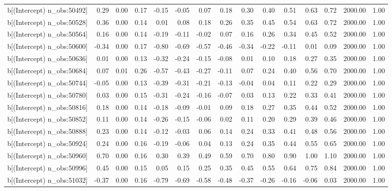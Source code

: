 \begin{table}[ht]
\begin{tabular}{rrrrrrrrrrrrrrr}
  b[(Intercept) n\_obs:50492] & 0.29 & 0.00 & 0.17 & -0.15 & -0.05 & 0.07 & 0.18 & 0.30 & 0.40 & 0.51 & 0.63 & 0.72 & 2000.00 & 1.00 \\ 
  b[(Intercept) n\_obs:50528] & 0.36 & 0.00 & 0.14 & 0.01 & 0.08 & 0.18 & 0.26 & 0.35 & 0.45 & 0.54 & 0.63 & 0.72 & 2000.00 & 1.00 \\ 
  b[(Intercept) n\_obs:50564] & 0.16 & 0.00 & 0.14 & -0.19 & -0.11 & -0.02 & 0.07 & 0.16 & 0.26 & 0.34 & 0.45 & 0.52 & 2000.00 & 1.00 \\ 
  b[(Intercept) n\_obs:50600] & -0.34 & 0.00 & 0.17 & -0.80 & -0.69 & -0.57 & -0.46 & -0.34 & -0.22 & -0.11 & 0.01 & 0.09 & 2000.00 & 1.00 \\ 
  b[(Intercept) n\_obs:50636] & 0.01 & 0.00 & 0.13 & -0.32 & -0.24 & -0.15 & -0.08 & 0.01 & 0.10 & 0.18 & 0.27 & 0.35 & 2000.00 & 1.00 \\ 
  b[(Intercept) n\_obs:50684] & 0.07 & 0.01 & 0.26 & -0.57 & -0.43 & -0.27 & -0.11 & 0.07 & 0.24 & 0.40 & 0.56 & 0.70 & 2000.00 & 1.00 \\ 
  b[(Intercept) n\_obs:50744] & -0.05 & 0.00 & 0.13 & -0.39 & -0.31 & -0.21 & -0.13 & -0.04 & 0.04 & 0.11 & 0.22 & 0.29 & 2000.00 & 1.00 \\ 
  b[(Intercept) n\_obs:50780] & 0.03 & 0.00 & 0.15 & -0.31 & -0.24 & -0.16 & -0.07 & 0.03 & 0.13 & 0.22 & 0.33 & 0.41 & 2000.00 & 1.00 \\ 
  b[(Intercept) n\_obs:50816] & 0.18 & 0.00 & 0.14 & -0.18 & -0.09 & -0.01 & 0.09 & 0.18 & 0.27 & 0.35 & 0.44 & 0.52 & 2000.00 & 1.00 \\ 
  b[(Intercept) n\_obs:50852] & 0.11 & 0.00 & 0.14 & -0.26 & -0.15 & -0.06 & 0.02 & 0.11 & 0.20 & 0.29 & 0.39 & 0.46 & 2000.00 & 1.00 \\ 
  b[(Intercept) n\_obs:50888] & 0.23 & 0.00 & 0.14 & -0.12 & -0.03 & 0.06 & 0.14 & 0.24 & 0.33 & 0.41 & 0.48 & 0.56 & 2000.00 & 1.00 \\ 
  b[(Intercept) n\_obs:50924] & 0.24 & 0.00 & 0.16 & -0.19 & -0.06 & 0.04 & 0.13 & 0.24 & 0.35 & 0.44 & 0.55 & 0.65 & 2000.00 & 1.00 \\ 
  b[(Intercept) n\_obs:50960] & 0.70 & 0.00 & 0.16 & 0.30 & 0.39 & 0.49 & 0.59 & 0.70 & 0.80 & 0.90 & 1.00 & 1.10 & 2000.00 & 1.00 \\ 
  b[(Intercept) n\_obs:50996] & 0.45 & 0.00 & 0.15 & 0.05 & 0.15 & 0.25 & 0.35 & 0.45 & 0.55 & 0.64 & 0.75 & 0.84 & 2000.00 & 1.00 \\ 
  b[(Intercept) n\_obs:51032] & -0.37 & 0.00 & 0.16 & -0.79 & -0.69 & -0.58 & -0.48 & -0.37 & -0.26 & -0.16 & -0.06 & 0.03 & 2000.00 & 1.00 \\ 

\end{tabular}
\end{table}
